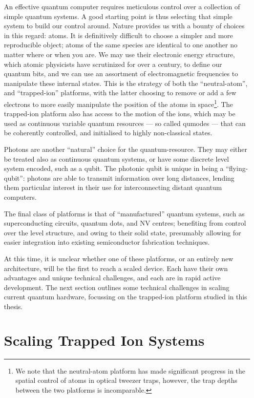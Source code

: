 An effective quantum computer requires meticulous control over a collection of
simple quantum systems. A good starting point is thus selecting that simple
system to build our control around. Nature provides us with a bounty of choices
in this regard: atoms. It is definitively difficult to choose a simpler and more reproducible object; atoms of the same species are
identical to one another no matter where or when you are.
We may use their electronic energy structure, which atomic physicists have
scrutinized for over a century, to define our quantum bits, and we can use an
assortment of electromagnetic frequencies to manipulate these internal states.
This is the strategy of both the ``neutral-atom'', and ``trapped-ion''
platforms, with the latter choosing to remove or add a few electrons to more
easily manipulate the position of the atoms in space\footnote{We note that the
neutral-atom platform has made significant progress in the spatial control of atoms in optical tweezer traps, however, the trap depths between the two platforms is incomparable.}. The trapped-ion platform also has access to the motion of the ions, which may be used as continuous variable quantum resources --- so called qumodes --- that
can be coherently controlled, and initialised to highly non-classical states.

Photons are another ``natural'' choice for the quantum-resource. They may either be treated also as continuous quantum systems, or have some discrete level system encoded, such as a qubit. The photonic qubit is unique in being a ``flying-qubit'': photons are
able to transmit information over long distances, lending them particular interest in their use for interconnecting distant quantum computers.

The final class of platforms is that of
``manufactured'' quantum systems, such as superconducting circuits, quantum dots, and NV centres;
benefiting from control over the level structure, and owing to their solid
state, presumably allowing for easier integration into existing semiconductor
fabrication techniques.

At this time, it is unclear whether one of these platforms,
or an entirely new architecture, will be the first to reach a scaled device.
Each have their own advantages and unique technical challenges, and each are in
rapid active development. The next section outlines some technical challenges in
scaling current quantum hardware, focussing on the trapped-ion platform studied in this thesis.

\section{Scaling Trapped Ion Systems}

